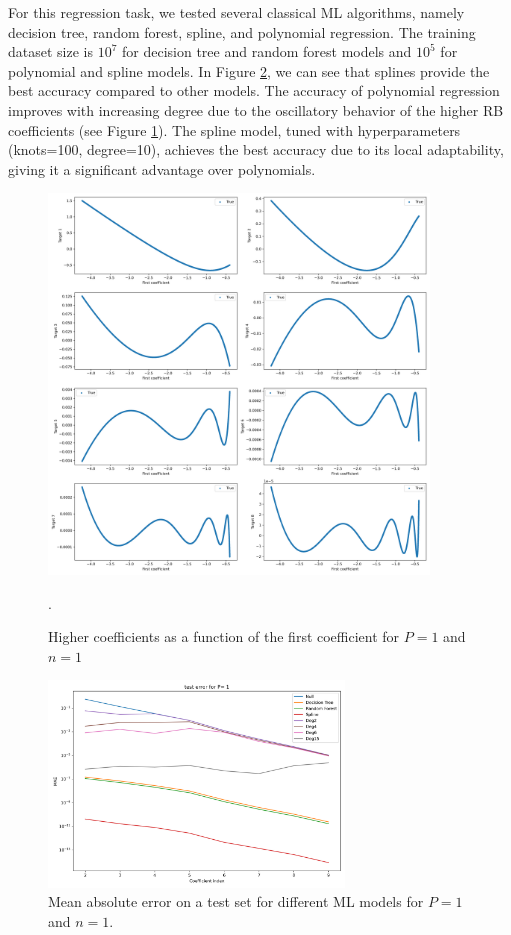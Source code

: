 \documentclass[graybox]{svmult}
\begin{document}
For this regression task, we tested several classical ML algorithms, namely decision tree, random forest, spline, and polynomial regression. The training dataset size is $10^7$ for decision tree and random forest models and $10^5$ for polynomial and spline models. In Figure \ref{fig:MLP1}, we can see that splines provide the best accuracy compared to other models. The accuracy of polynomial regression improves with increasing degree due to the oscillatory behavior of the higher RB coefficients (see Figure \ref{fig:dataP1}). The spline model, tuned with hyperparameters (knots=100, degree=10), achieves the best accuracy due to its local adaptability, giving it a significant advantage over polynomials.
\begin{figure}[!hb]
    \centering
\includegraphics[width=0.9\textwidth] {dataP1.png}
    \caption{ Higher coefficients as a function of the first coefficient for $P=1$ and $n=1$}.
    \label{fig:dataP1}
\end{figure}

\begin{figure}[!htbp]
    \centering
\includegraphics[width=0.7\textwidth] {MLP1.png}
    \caption{Mean absolute error on a test set for different ML models for $P=1$ and $n=1$.}
    \label{fig:MLP1}
\end{figure}
\end{document}
